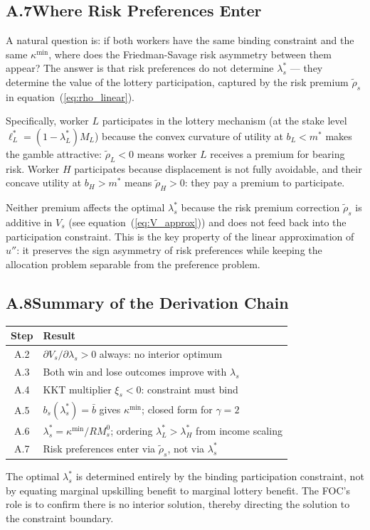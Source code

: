 \documentclass[12pt,a4paper]{article}
\begin{document}
\subsection*{A.7\quad Where Risk Preferences Enter}

A natural question is: if both workers have the same binding constraint
and the same $\kappa^{\min}$, where does the Friedman-Savage risk
asymmetry between them appear? The answer is that risk preferences
do not determine $\lambda_s^*$ --- they determine the value of the
lottery participation, captured by the risk premium $\tilde\rho_s$ in
equation~(\ref{eq:rho_linear}).

Specifically, worker $L$ participates in the lottery mechanism (at the
stake level $\ell_L^* = (1-\lambda_L^*)M_L$) because the convex
curvature of utility at $b_L < m^*$ makes the gamble attractive:
$\tilde\rho_L < 0$ means worker $L$ receives a premium for bearing
risk. Worker $H$ participates because displacement is not fully
avoidable, and their concave utility at $b_H > m^*$ means $\tilde\rho_H > 0$:
they pay a premium to participate.

Neither premium affects the optimal $\lambda_s^*$ because the risk
premium correction $\tilde\rho_s$ is additive in $V_s$ (see
equation~(\ref{eq:V_approx})) and does not feed back into the
participation constraint. This is the key property of the linear
approximation of $u''$: it preserves the sign asymmetry of risk
preferences while keeping the allocation problem separable from the
preference problem.

\subsection*{A.8\quad Summary of the Derivation Chain}

\begin{center}
\renewcommand{\arraystretch}{1.4}
\begin{tabular}{cl}
\toprule
Step & Result \\
\midrule
A.2 & $\partial V_s/\partial\lambda_s > 0$ always: no interior optimum \\
A.3 & Both win and lose outcomes improve with $\lambda_s$ \\
A.4 & KKT multiplier $\xi_s < 0$: constraint must bind \\
A.5 & $b_s(\lambda_s^*) = \bar{b}$ gives $\kappa^{\min}$;
      closed form for $\gamma = 2$ \\
A.6 & $\lambda_s^* = \kappa^{\min}/RM_s^0$;
      ordering $\lambda_L^* > \lambda_H^*$ from income scaling \\
A.7 & Risk preferences enter via $\tilde\rho_s$,
      not via $\lambda_s^*$ \\
\bottomrule
\end{tabular}
\end{center}

\medskip

\noindent The optimal $\lambda_s^*$ is determined entirely by the
binding participation constraint, not by equating marginal upskilling
benefit to marginal lottery benefit. The FOC's role is to confirm
there is no interior solution, thereby directing the solution to the
constraint boundary.
\end{document}
